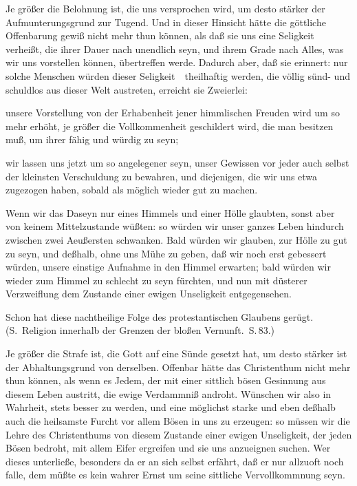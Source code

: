 \begin{aufza}
\item {}
\begin{aufzb}
\item {} Je größer die Belohnung ist, die uns versprochen wird, um desto stärker der Aufmunterungsgrund zur Tugend. Und in dieser Hinsicht hätte die göttliche Offenbarung gewiß nicht mehr thun können, als daß sie uns eine Seligkeit verheißt, die ihrer Dauer nach unendlich seyn, und ihrem Grade nach Alles, was wir uns vorstellen können, übertreffen werde. Dadurch aber, daß sie erinnert: nur solche Menschen würden dieser Seligkeit~\ theilhaftig werden, die völlig sünd- und schuldlos aus dieser Welt austreten, erreicht sie Zweierlei:
\begin{aufzc}
\item unsere Vorstellung von der Erhabenheit jener himmlischen Freuden wird um so mehr erhöht, je größer die Vollkommenheit geschildert wird, die man besitzen muß, um ihrer fähig und würdig zu seyn;
\item wir lassen uns jetzt um so angelegener seyn, unser Gewissen vor jeder auch selbst der kleinsten Verschuldung zu bewahren, und diejenigen, die wir uns etwa zugezogen haben, sobald als möglich wieder gut zu machen.
\end{aufzc}
\item {} Wenn wir das Daseyn nur eines Himmels und einer Hölle glaubten, sonst aber von keinem Mittelzustande wüßten: so würden wir unser ganzes Leben hindurch zwischen zwei Aeußersten schwanken. Bald würden wir glauben, zur Hölle zu gut zu seyn, und deßhalb, ohne uns Mühe zu geben, daß wir noch erst gebessert würden, unsere einstige Aufnahme in den Himmel erwarten; bald würden wir wieder zum Himmel zu schlecht zu seyn fürchten, und nun mit düsterer Verzweiflung dem Zustande einer ewigen Unseligkeit entgegensehen.
\begin{RWanm} 
Schon  hat diese nachtheilige Folge des protestantischen Glaubens gerügt. (S.\ Religion innerhalb der Grenzen der bloßen Vernunft.\ S.\,83.)
\end{RWanm}
\item {} Je größer die Strafe ist, die Gott auf eine Sünde gesetzt hat, um desto stärker ist der Abhaltungsgrund von derselben. Offenbar hätte das Christenthum nicht mehr thun können, als wenn es Jedem, der mit einer sittlich bösen Gesinnung aus diesem Leben austritt, die ewige Verdammniß androht. Wünschen wir also in Wahrheit, stets besser zu werden, und eine möglichst starke und eben deßhalb auch die heilsamste Furcht vor allem Bösen in uns zu erzeugen: so müssen wir die Lehre des Christenthums von diesem Zustande einer ewigen Unseligkeit, der jeden Bösen bedroht, mit allem Eifer ergreifen und sie uns anzueignen suchen. Wer dieses unterließe, besonders da er an sich selbst erfährt, daß er nur allzuoft noch falle, dem müßte es kein wahrer Ernst um seine sittliche Vervollkommnung seyn.

\end{aufzb}
\end{aufza}
